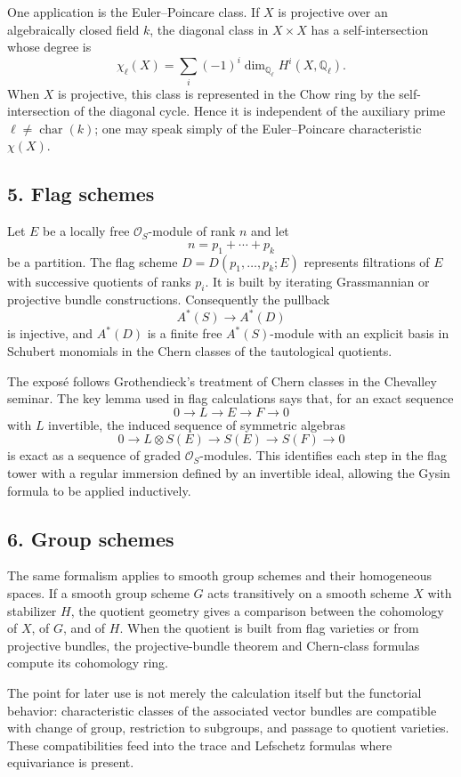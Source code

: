 \documentclass[14pt]{extarticle}
\newcommand{\QQ}{\mathbb Q}
\newcommand{\cO}{\mathcal O}
\begin{document}
One application is the Euler--Poincare class. If $X$ is projective over an algebraically closed field $k$, the diagonal class in $X\times X$ has a self-intersection whose degree is
\[
   \chi_\ell(X)=\sum_i (-1)^i\dim_{\QQ_\ell}H^i(X,\QQ_\ell).
\]
When $X$ is projective, this class is represented in the Chow ring by the self-intersection of the diagonal cycle. Hence it is independent of the auxiliary prime $\ell\ne\operatorname{char}(k)$; one may speak simply of the Euler--Poincare characteristic $\chi(X)$.

\subsection*{5. Flag schemes}

Let $E$ be a locally free $\cO_S$-module of rank $n$ and let
\[
   n=p_1+\cdots+p_k
\]
be a partition. The flag scheme $D=D(p_1,\ldots,p_k;E)$ represents filtrations of $E$ with successive quotients of ranks $p_i$. It is built by iterating Grassmannian or projective bundle constructions. Consequently the pullback
\[
   A^*(S)\longrightarrow A^*(D)
\]
is injective, and $A^*(D)$ is a finite free $A^*(S)$-module with an explicit basis in Schubert monomials in the Chern classes of the tautological quotients.

The expos\'e follows Grothendieck's treatment of Chern classes in the Chevalley seminar. The key lemma used in flag calculations says that, for an exact sequence
\[
   0\to L\to E\to F\to0
\]
with $L$ invertible, the induced sequence of symmetric algebras
\[
   0\to L\otimes S(E)\to S(E)\to S(F)\to0
\]
is exact as a sequence of graded $\cO_S$-modules. This identifies each step in the flag tower with a regular immersion defined by an invertible ideal, allowing the Gysin formula to be applied inductively.

\subsection*{6. Group schemes}

The same formalism applies to smooth group schemes and their homogeneous spaces. If a smooth group scheme $G$ acts transitively on a smooth scheme $X$ with stabilizer $H$, the quotient geometry gives a comparison between the cohomology of $X$, of $G$, and of $H$. When the quotient is built from flag varieties or from projective bundles, the projective-bundle theorem and Chern-class formulas compute its cohomology ring.

The point for later use is not merely the calculation itself but the functorial behavior: characteristic classes of the associated vector bundles are compatible with change of group, restriction to subgroups, and passage to quotient varieties. These compatibilities feed into the trace and Lefschetz formulas where equivariance is present.
\end{document}
